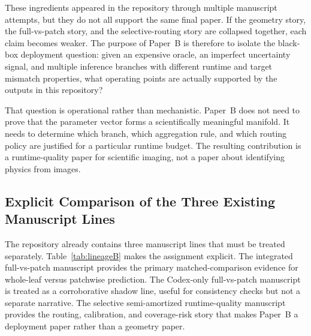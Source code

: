 \documentclass[11pt,a4paper]{article}
\begin{document}
These ingredients appeared in the repository through multiple manuscript attempts, but they do not all support the same final paper.
If the geometry story, the full-vs-patch story, and the selective-routing story are collapsed together, each claim becomes weaker.
The purpose of Paper~B is therefore to isolate the black-box deployment question: given an expensive oracle, an imperfect uncertainty signal, and multiple inference branches with different runtime and target mismatch properties, what operating points are actually supported by the outputs in this repository?

That question is operational rather than mechanistic.
Paper~B does not need to prove that the parameter vector forms a scientifically meaningful manifold.
It needs to determine which branch, which aggregation rule, and which routing policy are justified for a particular runtime budget.
The resulting contribution is a runtime-quality paper for scientific imaging, not a paper about identifying physics from images.

\subsection{Explicit Comparison of the Three Existing Manuscript Lines}
The repository already contains three manuscript lines that must be treated separately.
Table~\ref{tab:lineageB} makes the assignment explicit.
The integrated full-vs-patch manuscript provides the primary matched-comparison evidence for whole-leaf versus patchwise prediction.
The Codex-only full-vs-patch manuscript is treated as a corroborative shadow line, useful for consistency checks but not a separate narrative.
The selective semi-amortized runtime-quality manuscript provides the routing, calibration, and coverage-risk story that makes Paper~B a deployment paper rather than a geometry paper.
\end{document}
